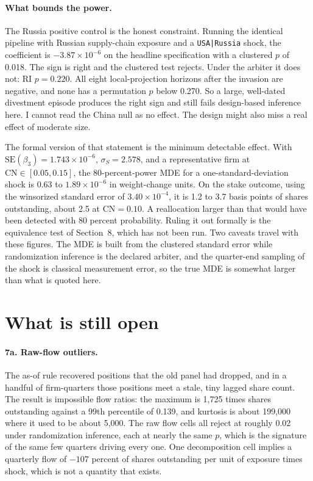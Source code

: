 \documentclass[11pt]{article}
\begin{document}
\paragraph{What bounds the power.} The Russia positive control is the honest
constraint. Running the identical pipeline with Russian supply-chain exposure
and a \texttt{USA|Russia} shock, the coefficient is $-3.87 \times 10^{-6}$ on
the headline specification with a clustered $p$ of 0.018. The sign is right and
the clustered test rejects. Under the arbiter it does not: RI $p = 0.220$. All
eight local-projection horizons after the invasion are negative, and none has a
permutation $p$ below 0.270. So a large, well-dated divestment episode produces
the right sign and still fails design-based inference here. I cannot read the
China null as no effect. The design might also miss a real effect of moderate
size.

The formal version of that statement is the minimum detectable effect. With
$\mathrm{SE}(\beta_3) = 1.743 \times 10^{-6}$, $\sigma_S = 2.578$, and a
representative firm at $\mathrm{CN} \in [0.05, 0.15]$, the 80-percent-power MDE
for a one-standard-deviation shock is $0.63$ to $1.89 \times 10^{-6}$ in
weight-change units. On the stake outcome, using the winsorized standard error
of $3.40 \times 10^{-4}$, it is 1.2 to 3.7 basis points of shares outstanding,
about 2.5 at $\mathrm{CN} = 0.10$. A reallocation larger than that would have
been detected with 80 percent probability. Ruling it out formally is the
equivalence test of Section~8, which has not been run. Two caveats travel with
these figures. The MDE is built from the clustered standard error while
randomization inference is the declared arbiter, and the quarter-end sampling
of the shock is classical measurement error, so the true MDE is somewhat larger
than what is quoted here.

\section{What is still open}

\paragraph{7a. Raw-flow outliers.} The as-of rule recovered positions that the
old panel had dropped, and in a handful of firm-quarters those positions meet a
stale, tiny lagged share count. The result is impossible flow ratios: the
maximum is 1,725 times shares outstanding against a 99th percentile of 0.139,
and kurtosis is about 199,000 where it used to be about 5,000. The raw flow
cells all reject at roughly 0.02 under randomization inference, each at nearly
the same $p$, which is the signature of the same few quarters driving every
one. One decomposition cell implies a quarterly flow of $-107$
percent of shares outstanding per unit of exposure times shock, which is not a
quantity that exists.
\end{document}
